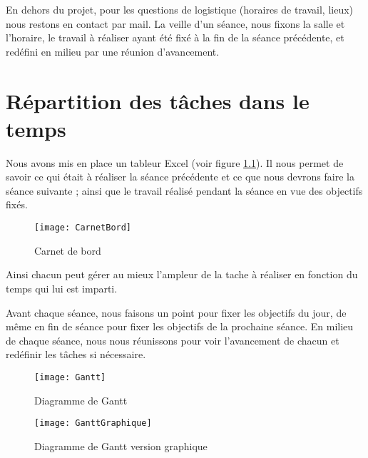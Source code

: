 En dehors du projet, pour les questions de logistique (horaires de travail, lieux) nous restons en contact par mail. La veille d'un séance, nous fixons la salle et l'horaire, le travail à réaliser ayant été fixé à la fin de la séance précédente, et redéfini en milieu par une réunion d'avancement.  

\chapter{Répartition des tâches dans le temps}

Nous avons mis en place un tableur Excel (voir figure \ref{fig:CarnetBord}). Il nous permet de savoir ce qui était à réaliser la séance précédente et ce que nous devrons faire la séance suivante ; ainsi que le travail réalisé pendant la séance en vue des objectifs fixés. 

\begin{figure}[h]
  \centering
  \texttt{[image: CarnetBord]}
  \caption{Carnet de bord}
  \label{fig:CarnetBord}
\end{figure}

Ainsi chacun peut gérer au mieux l'ampleur de la tache à réaliser en fonction du temps qui lui est imparti.
 
Avant chaque séance, nous faisons un point pour fixer les objectifs du jour, de même en fin de séance pour fixer les objectifs de la prochaine séance. 
En milieu de chaque séance, nous nous réunissons pour voir l'avancement de chacun et redéfinir les tâches si nécessaire. 

\begin{figure}[h]
  \centering
  \texttt{[image: Gantt]}
  \caption{Diagramme de Gantt}
  \label{fig:Gantt}
\end{figure}

\begin{figure}[h]
  \centering
  \texttt{[image: GanttGraphique]}
  \caption{Diagramme de Gantt version graphique}
  \label{fig:GanttGraphique}
\end{figure}
